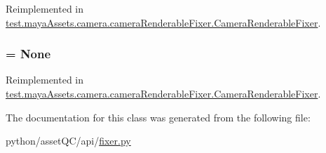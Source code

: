 \-Reimplemented in \hyperlink{classtest_1_1mayaAssets_1_1camera_1_1cameraRenderableFixer_1_1CameraRenderableFixer_ac17b1274830e822daefcab2a78fd6c0c}{test.\-maya\-Assets.\-camera.\-camera\-Renderable\-Fixer.\-Camera\-Renderable\-Fixer}.

\hypertarget{classassetQC_1_1api_1_1fixer_1_1Fixer_aa5abf1095031f0c0937a3249e1f3dcb1}{
\subsubsection[{priority}]{ = \-None}}\label{d7/da8/classassetQC_1_1api_1_1fixer_1_1Fixer_aa5abf1095031f0c0937a3249e1f3dcb1}


\-Reimplemented in \hyperlink{classtest_1_1mayaAssets_1_1camera_1_1cameraRenderableFixer_1_1CameraRenderableFixer_a0f98813546ea33efea007da514b86cca}{test.\-maya\-Assets.\-camera.\-camera\-Renderable\-Fixer.\-Camera\-Renderable\-Fixer}.



\-The documentation for this class was generated from the following file\-:\begin{DoxyCompactItemize}
\item 
python/asset\-Q\-C/api/\hyperlink{fixer_8py}{fixer.\-py}\end{DoxyCompactItemize}

